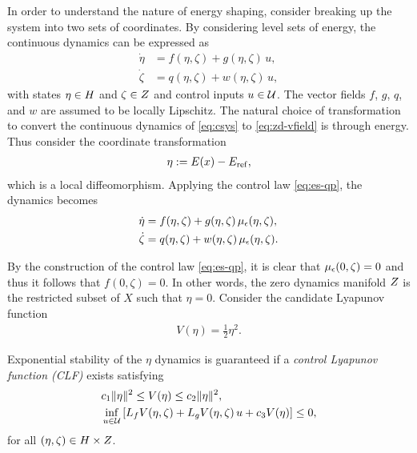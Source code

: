 \documentclass[twocolumn]{article}
\begin{document}
In order to understand the nature of energy shaping, consider breaking up the system into two sets of coordinates.
%
By considering level sets of energy, the continuous dynamics can be expressed as
\begin{align}
  \nonumber
  \dot \eta &= f(\eta, \zeta) + g(\eta, \zeta) \, u,\\
  \dot \zeta &= q(\eta, \zeta) + w(\eta, \zeta) \, u,
  \label{eq:zd-vfield}
\end{align}
%
with states $\eta \in H$ and $\zeta \in Z$ and control inputs $u \in \mathcal{U}$.
%
The vector fields $f$, $g$, $q$, and $w$ are assumed to be locally Lipschitz.
%
The natural choice of transformation to convert the continuous dynamics of \eqref{eq:csys} to \eqref{eq:zd-vfield} is through energy.
%
Thus consider the coordinate transformation
\begin{align}
  \eta := E(x) - E_{\mathrm{ref}},
\end{align}
which is a local diffeomorphism.
%
Applying the control law \eqref{eq:es-qp}, the dynamics becomes
\begin{align}
  \nonumber
  \dot \eta &= f(\eta, \zeta) + g(\eta, \zeta) \, \mu_{\epsilon}(\eta, \zeta),\\
  \dot \zeta &= q(\eta, \zeta) + w(\eta, \zeta) \, \mu_{\epsilon}(\eta, \zeta).
  \label{eq:zd-vfield-cl}
\end{align}

By the construction of the control law \eqref{eq:es-qp}, it is clear that $\mu_{\epsilon}(0, \zeta) = 0$ and thus it follows that $f(0, \zeta) = 0$.
%
In other words, the zero dynamics manifold $Z$ is the restricted subset of $X$ such that $\eta = 0$.
%
Consider the candidate Lyapunov function
\begin{align}
  V(\eta) = \frac{1}{2} \eta^{2}.
\end{align}

\begin{proposition}  
  Exponential stability of the $\eta$ dynamics is guaranteed if a {\em control Lyapunov function (CLF)} exists satisfying
  \begin{align}
    \label{eq:lyap-cond-nrg-es}
    &c_{1} \| \eta \|^{2} \leq V(\eta) \leq c_{2} \| \eta \|^2,\\
    \nonumber
    &\inf_{u \in \mathcal{U}} \left[ L_{f} V(\eta, \zeta) + L_{g} V(\eta, \zeta) \, u + c_{3} V(\eta) \right] \leq 0,
  \end{align}
  for all $(\eta, \zeta) \in H \times Z$.
\end{proposition}
\end{document}
